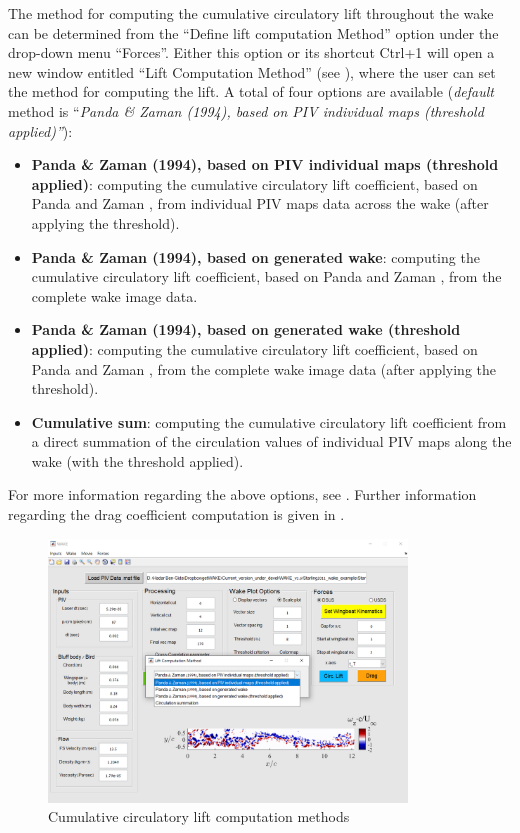 \documentclass[12pt,a4paper]{article}
\begin{document}
\newpage
The method for computing the cumulative circulatory lift throughout the wake can be determined from the ``Define lift computation Method'' option under the drop-down menu ``Forces''. 
Either this option or its shortcut Ctrl+1 will open a new window entitled ``Lift Computation Method'' (see ), where the user can set the method for computing the lift. A total of four options are available (\textit{default} method is ``\textit{Panda \& Zaman (1994), based on PIV individual maps (threshold applied)''}):
\begin{itemize}
	\item \textbf{Panda \& Zaman (1994), based on PIV individual maps (threshold applied)}: computing the cumulative circulatory lift coefficient, based on Panda and Zaman \cite{Panda1994}, from individual PIV maps data across the wake (after applying the threshold).
	\item \textbf{Panda \& Zaman (1994), based on generated wake}: computing the cumulative circulatory lift coefficient, based on Panda and Zaman \cite{Panda1994}, from the complete wake image data.
	\item \textbf{Panda \& Zaman (1994), based on generated wake (threshold applied)}: computing the cumulative circulatory lift coefficient, based on Panda and Zaman \cite{Panda1994}, from the complete wake image data (after applying the threshold).
	\item \textbf{Cumulative sum}: computing the cumulative circulatory lift coefficient from a direct summation of the circulation values of individual PIV maps along the wake (with the threshold applied).   
\end{itemize}
For more information regarding the above options, see . Further information regarding the drag coefficient computation is given in .

\begin{figure}[ht!]
	\centering
	\includegraphics[width=0.85\textwidth]{Lift-comp-methods}
	\caption{Cumulative circulatory lift computation methods}
	\label{fig:GUI-Lift-comp-methods}
\end{figure}
\end{document}
